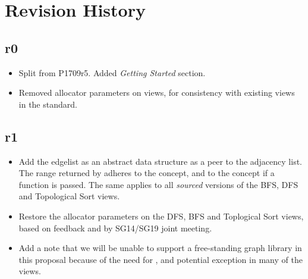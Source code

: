 \section{Revision History}

\subsection*{\paperno r0}

\begin{itemize}
      \item Split from P1709r5. Added \textit{Getting Started} section.
      \item Removed allocator parameters on views, for consistency with existing views in the standard. 
\end{itemize}

\subsection*{\paperno r1}
\begin{itemize}
      \item Add the edgelist as an abstract data structure as a peer to the adjacency list. 
            The range returned by  adheres to the  concept,
            and to the  concept if a  function is passed. The same applies to
            all \textit{sourced} versions of the BFS, DFS and Topological Sort views.
      \item Restore the allocator parameters on the DFS, BFS and Toplogical Sort views, based on feedback and 
            by SG14/SG19 joint meeting.
      \item Add a note that we will be unable to support a free-standing graph library in this proposal because
            of the need for ,  and potential  exception in many of 
            the views.
\end{itemize}
